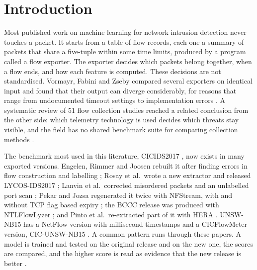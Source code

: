 \documentclass[pdflatex,sn-mathphys-num]{sn-jnl}
\newcommand{\litnum}[1]{#1}
\newcommand{\cicids}{CICIDS2017}
\theoremstyle{thmstyleone}%
\theoremstyle{thmstylethree}%
\begin{document}

\maketitle

\section{Introduction}\label{sec:intro}

Most published work on machine learning for network intrusion detection never touches a packet. It starts from a table of flow records, each one a summary of packets that share a five-tuple within some time limits, produced by a program called a flow exporter. The exporter decides which packets belong together, when a flow ends, and how each feature is computed. These decisions are not standardised. Vormayr, Fabini and Zseby compared several exporters on identical input and found that their output can diverge considerably, for reasons that range from undocumented timeout settings to implementation errors \cite{vormayr2020}. A systematic review of \litnum{51} flow collection studies reached a related conclusion from the other side: which telemetry technology is used decides which threats stay visible, and the field has no shared benchmark suite for comparing collection methods \cite{coutinho2025}.

The benchmark most used in this literature, \cicids{} \cite{sharafaldin2018}, now exists in many exported versions. Engelen, Rimmer and Joosen rebuilt it after finding errors in flow construction and labelling \cite{engelen2021}; Rosay et al.\ wrote a new extractor and released LYCOS-IDS2017 \cite{rosay2021,rosay2022}; Lanvin et al.\ corrected misordered packets and an unlabelled port scan \cite{lanvin2023}; Pekar and Jozsa regenerated it twice with NFStream, with and without TCP flag based expiry \cite{pekar2024}; the BCCC release was produced with NTLFlowLyzer \cite{shafi2024}; and Pinto et al.\ re-extracted part of it with HERA \cite{pinto2025}. UNSW-NB15 \cite{moustafa2015} has a NetFlow version with millisecond timestamps \cite{luay2026} and a CICFlowMeter version, CIC-UNSW-NB15 \cite{mohammadian2024}. A common pattern runs through these papers. A model is trained and tested on the original release and on the new one, the scores are compared, and the higher score is read as evidence that the new release is better \cite{rosay2021,pinto2025,vitorino2025,sarhan2022}.
\end{document}
